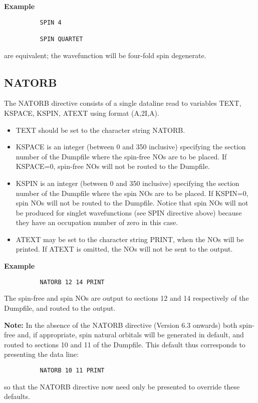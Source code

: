 \documentclass[11pt,fleqn]{article}
\begin{document}
{\bf Example}
{
\footnotesize
\begin{verbatim}
          SPIN 4

          SPIN QUARTET
\end{verbatim}
}

are equivalent; the wavefunction will be four-fold spin degenerate.

\subsection[NATORB]{NATORB}

The NATORB directive consists of a single dataline read to variables
TEXT, KSPACE, KSPIN, ATEXT using format (A,2I,A).
\begin{itemize}
\item  TEXT should be set to the character string NATORB.
\item  KSPACE is an integer (between 0 and 350 inclusive) specifying the
section number of the Dumpfile where the spin-free NOs are to be placed.
If KSPACE=0, spin-free NOs will not be routed to the Dumpfile.
\item KSPIN is an integer (between 0 and 350 inclusive) specifying the
section number of the Dumpfile where the spin NOs are to be placed.
If KSPIN=0, spin NOs will not be routed to the Dumpfile. Notice
that spin NOs will not be produced for singlet wavefunctions (see
SPIN directive above) because they have an occupation number of
zero in this case.
\item  ATEXT may be set to the character string PRINT, when the NOs 
will be printed. If ATEXT is omitted, the NOs will 
not be sent to the output.
\end{itemize}

{\bf Example}
{
\footnotesize
\begin{verbatim}
          NATORB 12 14 PRINT
\end{verbatim}
}

The spin-free and spin NOs are output to sections 12
and 14 respectively of the Dumpfile, and routed to the output.

{\bf Note:} In the absence of the NATORB directive (Version 6.3 onwards)
both spin-free and, if appropriate, spin natural orbitals will
be generated in default, and routed to sections 10 and 11 of
the Dumpfile. This default thus corresponds to presenting the
data line:
{
\footnotesize
\begin{verbatim}
          NATORB 10 11 PRINT
\end{verbatim}
}
so that the NATORB directive now need only be presented to override
these defaults.
\end{document}

